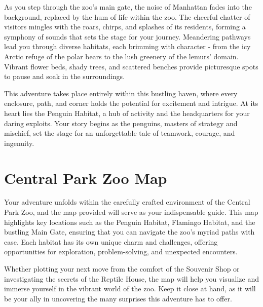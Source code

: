 \onecolumn
\begin{multicols}{2}

{\entryfont As you step through the zoo's main gate, the noise of Manhattan fades into the background, replaced by the hum of life within the zoo. The cheerful chatter of visitors mingles with the roars, chirps, and splashes of its residents, forming a symphony of sounds that sets the stage for your journey. Meandering pathways lead you through diverse habitats, each brimming with character - from the icy Arctic refuge of the polar bears to the lush greenery of the lemurs' domain. Vibrant flower beds, shady trees, and scattered benches provide picturesque spots to pause and soak in the surroundings.

This adventure takes place entirely within this bustling haven, where every enclosure, path, and corner holds the potential for excitement and intrigue. At its heart lies the Penguin Habitat, a hub of activity and the headquarters for your daring exploits. Your story begins as the penguins, masters of strategy and mischief, set the stage for an unforgettable tale of teamwork, courage, and ingenuity.}

\section*{Central Park Zoo Map}
{\entryfont Your adventure unfolds within the carefully crafted environment of the Central Park Zoo, and the map provided will serve as your indispensable guide. This map highlights key locations such as the Penguin Habitat, Flamingo Habitat, and the bustling Main Gate, ensuring that you can navigate the zoo's myriad paths with ease. Each habitat has its own unique charm and challenges, offering opportunities for exploration, problem-solving, and unexpected encounters.

Whether plotting your next move from the comfort of the Souvenir Shop or investigating the secrets of the Reptile House, the map will help you visualize and immerse yourself in the vibrant world of the zoo. Keep it close at hand, as it will be your ally in uncovering the many surprises this adventure has to offer.}
\end{multicols}
